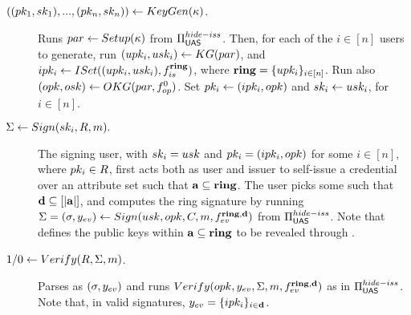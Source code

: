 

\begin{description}
\item[$((pk_1,sk_1),...,(pk_n,sk_n)) \gets KeyGen(\kappa)$.] Runs
  $par \gets Setup(\kappa)$ from $\Pi_{\mathsf{UAS}}^{hide-iss}$. Then, for each of
  the $i \in [n]$ users to generate, run $(upk_i,usk_i) \gets KG(par)$,
  and $ipk_i \gets ISet((upk_i,usk_i),f_{is}^{\mathbf{ring}})$, where $\mathbf{ring} =
  \lbrace upk_i \rbrace_{i\in[n]}$. Run also $(opk,osk) \gets OKG(par,
  f_{op}^0)$. Set $pk_i \gets (ipk_i,opk)$ and $sk_i \gets usk_i$, for
  $i\in[n]$.
\item[$\Sigma \gets Sign(sk_i,R,m).$]
  The signing user, with $sk_i=usk$ and $pk_i=(ipk_i,opk)$ for some $i \in
  [n]$, where $pk_i \in R$, first acts both as user and issuer to self-issue a
  credential \Cred over an attribute set \attrs such that $\mathbf{a} \subseteq
  \mathbf{ring}$. The user picks some \dattrs such that $\mathbf{d} \subseteq [|\mathbf{a}|]$,
  and computes the ring signature by running $\Sigma = (\sigma,y_{ev}) \gets
  Sign(usk,opk,C,m,f_{ev}^{\mathbf{ring},\mathbf{d}})$ from
  $\Pi_{\mathsf{UAS}}^{hide-iss}$. Note that \dattrs defines the public keys within
  $\mathbf{a} \subseteq \mathbf{ring}$ to be revealed through \yeval.
\item[$1/0 \gets Verify(R,\Sigma,m)$.] Parses \Sig as $(\sigma,y_{ev})$ and
  runs $Verify(opk,y_{ev},\Sigma,m,f_{ev}^{\mathbf{ring},\mathbf{d}})$ as in
  $\Pi_{\mathsf{UAS}}^{hide-iss}$. Note that, in valid signatures, $y_{ev} = \lbrace
  ipk_i\rbrace_{i\in\mathbf{d}}$.
\end{description}


